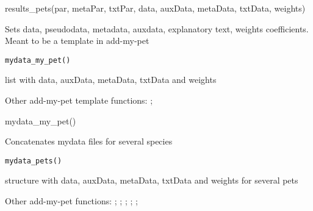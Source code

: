 \documentclass[a4paper]{book}
\begin{document}
%
\begin{Examples}
\begin{ExampleCode}
results_pets(par, metaPar, txtPar, data, auxData, metaData, txtData, weights)
\end{ExampleCode}
\end{Examples}
%
\begin{Description}\relax
Sets data, pseudodata, metadata, auxdata, explanatory text, weights coefficients. Meant to be a template in add-my-pet
\end{Description}
%
\begin{Usage}
\begin{verbatim}
mydata_my_pet()
\end{verbatim}
\end{Usage}
%
\begin{Value}
list with data, auxData, metaData, txtData and weights
\end{Value}
%
\begin{SeeAlso}\relax
Other add-my-pet template functions: ;
\end{SeeAlso}
%
\begin{Examples}
\begin{ExampleCode}
mydata_my_pet()
\end{ExampleCode}
\end{Examples}
%
\begin{Description}\relax
Concatenates mydata files for several species
\end{Description}
%
\begin{Usage}
\begin{verbatim}
mydata_pets()
\end{verbatim}
\end{Usage}
%
\begin{Value}
structure with data, auxData, metaData, txtData and weights for several pets
\end{Value}
%
\begin{SeeAlso}\relax
Other add-my-pet functions: ;
; ;
; ;
\end{SeeAlso}
\end{document}

